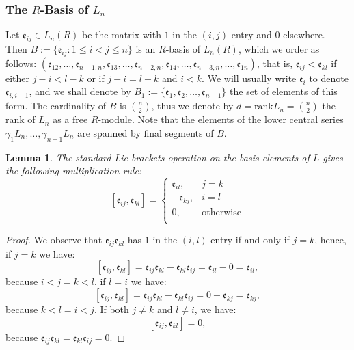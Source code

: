 \documentclass{article}
\newtheorem{lemma4}[paragraph]{Lemma}
\newcommand{\e}{\mathfrak{e}}
\begin{document}
\subsubsection{The $R$-Basis of $L_n$}
\label{R-algebra-basis}
Let $\e_{ij}\in{L}_{n}(R)$ be the matrix with $1$ in the $(i,j)$ entry and $0$ elsewhere. Then $B:=\{\e_{ij} : 1\leq{i}<{j}\leq{n}\}$ is an $R$-basis of $L_n(R)$, which we order as follows: $(\e_{12},\dots,\e_{n-1,n},\e_{13},\dots,\e_{n-2,n},\e_{14},\dots,\e_{n-3,n},\dots,\e_{1n})$, that is, $\e_{ij}<\e_{kl}$ if either $j-i<l-k$ or if $j-i=l-k$ and $i<k$. We will usually write $\e_i$ to denote $\e_{i,i+1}$, and we shall denote by $B_1:=\{\e_1,\e_2,\dots,\e_{n-1}\}$ the set of elements of this form. The cardinality of $B$ is $\binom{n}{2}$, thus we denote by $d=\text{rank}{L}_n=\binom{n}{2}$ the rank of $L_n$ as a free $R$-module. Note that the elements of the lower central series $\gamma_{1}L_{n},\dots,\gamma_{n-1}L_{n}$ are spanned by final segments of $B$. 
\begin{lemma4}
\label{lem:multiplication-rule}
The standard Lie brackets operation on the basis elements of $L$ gives the following multiplication rule:
\[[\e_{ij},\e_{kl}]=\begin{cases}
\e_{il},&j=k\\
-\e_{kj},&i=l\\
0,&\text{otherwise}\\
\end{cases}\]
\end{lemma4}
\begin{proof}
We observe that $\e_{ij}\e_{kl}$ has $1$ in the $(i,l)$ entry if and only if $j=k$, hence, if $j=k$ we have:
\[
[\e_{ij},\e_{kl}]=\e_{ij}\e_{kl}-\e_{kl}\e_{ij}=\e_{il}-0=\e_{il},
\]
because $i<j=k<l$. if $l=i$ we have:
\[
[\e_{ij},\e_{kl}]=\e_{ij}\e_{kl}-\e_{kl}\e_{ij}=0-\e_{kj}=\e_{kj},
\]
because $k<l=i<j$.
If both $j\neq{k}$ and $l\neq{i}$, we have:
\[
[\e_{ij},\e_{kl}]=0,
\]
because $\e_{ij}\e_{kl}=\e_{kl}\e_{ij}=0$.
\end{proof}
\end{document}
